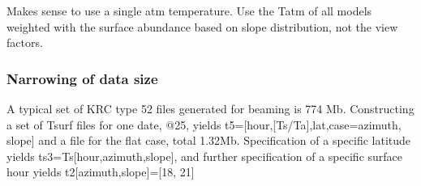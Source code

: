 \documentclass{article}
\begin{document}
\vspace{3mm}
Makes sense to use a single atm temperature. Use the Tatm of all models weighted
with the surface abundance based on slope distribution, not the view factors.

\subsubsection{Narrowing of data size}
A typical set of KRC type 52 files generated for beaming is 774 Mb. Constructing
a set of Tsurf files for one date, @25, yields
t5=[hour,[Ts/Ta],lat,case=azimuth, slope] and a file for the flat case, total
1.32Mb.  Specification of a specific latitude yields ts3=Ts[hour,azimuth,slope],
and further specification of a specific surface hour yields
t2[azimuth,slope]=[18, 21]
 
\end{document}
